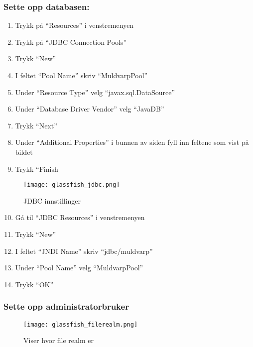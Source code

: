\documentclass[../main.tex]{subfiles}
\begin{document}
\subsubsection{Sette opp databasen:}

\begin{enumerate}
\item Trykk på “Resources” i venstremenyen
\item Trykk på “JDBC Connection Pools”
\item Trykk “New”
\item I feltet “Pool Name” skriv “MuldvarpPool”
\item Under “Resource Type” velg “javax.sql.DataSource”
\item Under “Database Driver Vendor” velg “JavaDB”
\item Trykk “Next”
\item Under “Additional Properties” i bunnen av siden fyll inn feltene som vist på bildet
\item Trykk “Finish
\end{enumerate}

\begin{figure}[H]
  \centering
  \texttt{[image: glassfish\_jdbc.png]}
  \caption{JDBC innstillinger}
\end{figure}

\begin{enumerate}
\setcounter{enumi}{9}
\item Gå til “JDBC Resources” i venstremenyen
\item Trykk “New”
\item I feltet “JNDI Name” skriv “jdbc/muldvarp”
\item Under “Pool Name” velg “MuldvarpPool”
\item Trykk “OK”
\end{enumerate}

\subsubsection{Sette opp administratorbruker}

\begin{wrapfigure}{l}{3.5cm}
  \begin{center}
    \texttt{[image: glassfish\_filerealm.png]}
  \end{center}
  \caption{Viser hvor file realm er}
\end{wrapfigure}
\end{document}
